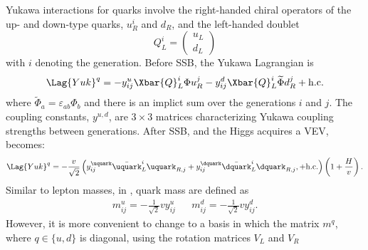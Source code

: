 Yukawa interactions for quarks involve the right-handed chiral operators of the up- and down-type
quarks, $u_R^i$ and $d_R$, and the left-handed doublet
\begin{equation}
  Q_L^i = \begin{pmatrix}u_L\\d_L\end{pmatrix}
\end{equation}
with $i$ denoting the generation.
Before SSB, the Yukawa Lagrangian is
\begin{equation}
  \Lag{Yuk}^q = - y_{ij}^u\Xbar{Q}_L^i\Phi u_R^j
  - y_{ij}^d\Xbar{Q}_L^i\widetilde\Phi d_R^j + \mathrm{h.c.}
  \label{eq:th:lagyukq}
\end{equation}
where $\widetilde\Phi_a = \varepsilon_{ab}\Phi_b$ and there is an implict sum over the generations
$i$ and $j$.
The coupling constants, $y^{u,d}$, are $3\times3$ matrices characterizing Yukawa coupling strengths
between generations.
After SSB, and the Higgs acquires a VEV,  becomes:
\begin{equation}
  \Lag{Yuk}^q =
  - \frac{v}{\sqrt{2}}
  \left(
  y_{ij}^\uquark\bar\uquark_L^i\uquark_{R,j}
  + y_{ij}^\dquark\bar\dquark_L^i\dquark_{R,j},
  + \mathrm{h.c.}
  \right)
  \left(1 + \frac{H}{v}\right).
  \label{eq:th:lagyuk2}
\end{equation}
Similar to lepton masses, in , quark mass are defined as
\begin{align}
  m_{ij}^u = -\frac{1}{\sqrt{2}}vy_{ij}^u &&
  m_{ij}^d = -\frac{1}{\sqrt{2}}vy_{ij}^d.
\end{align}
However, it is more convenient to change to a basis in which the matrix $m^q$, where $q\in\{u,d\}$
is diagonal, using the rotation matrices $V_L$ and $V_R$
